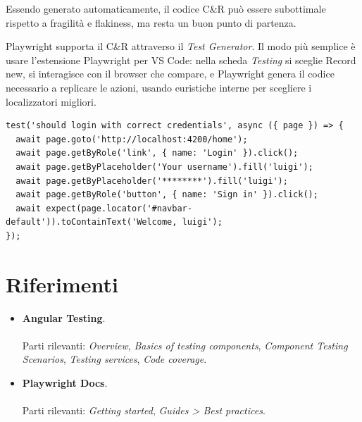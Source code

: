 Essendo generato automaticamente, il codice C\&R può essere subottimale rispetto
a fragilità e flakiness, ma resta un buon punto di partenza.

Playwright supporta il C\&R attraverso il \textit{Test Generator}. Il modo più
semplice è usare l'estensione Playwright per VS Code: nella scheda
\textit{Testing} si sceglie \guillemotleft Record new\guillemotright, si interagisce con il browser
che compare, e Playwright genera il codice necessario a replicare le azioni,
usando euristiche interne per scegliere i localizzatori migliori.

\begin{lstlisting}[style=ts, name=login.spec.ts (generato)]
test('should login with correct credentials', async ({ page }) => {
  await page.goto('http://localhost:4200/home');
  await page.getByRole('link', { name: 'Login' }).click();
  await page.getByPlaceholder('Your username').fill('luigi');
  await page.getByPlaceholder('********').fill('luigi');
  await page.getByRole('button', { name: 'Sign in' }).click();
  await expect(page.locator('#navbar-default')).toContainText('Welcome, luigi');
});
\end{lstlisting}

\section{Riferimenti}

\begin{itemize}
  \item \textbf{Angular Testing}. \\
         \\
        Parti rilevanti: \textit{Overview}, \textit{Basics of testing
        components}, \textit{Component Testing Scenarios}, \textit{Testing
        services}, \textit{Code coverage}.
  \item \textbf{Playwright Docs}. \\
         \\
        Parti rilevanti: \textit{Getting started}, \textit{Guides > Best
        practices}.
\end{itemize}

